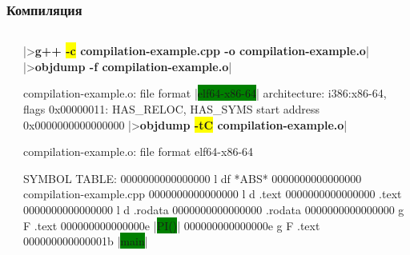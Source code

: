 \documentclass[compress]{beamer}
\newcommand{\shellprompt}{>}
\newcommand{\shellcommand}[1]{\shellprompt \space \textbf{#1}}
\begin{document}
\begin{frame}[fragile]

    \frametitle{Компиляция}

    \begin{columns}[T]

        \begin{column}{0.25\textwidth}


        \end{column}

        \begin{column}{0.75\textwidth}

            \begin{ConsoleWindow}
|\shellcommand{g++ \colorbox{yellow}{-c} compilation-example.cpp -o compilation-example.o}|
|\shellcommand{objdump -f compilation-example.o}|

compilation-example.o:     file format |\colorbox{green}{elf64-x86-64}|
architecture: i386:x86-64, flags 0x00000011:
HAS_RELOC, HAS_SYMS
start address 0x0000000000000000
|\shellcommand{objdump \colorbox{yellow}{-tC} compilation-example.o}|

compilation-example.o:     file format elf64-x86-64

SYMBOL TABLE:
0000000000000000 l    df *ABS*  0000000000000000 compilation-example.cpp
0000000000000000 l    d  .text  0000000000000000 .text
0000000000000000 l    d  .rodata        0000000000000000 .rodata
0000000000000000 g     F .text  000000000000000e |\colorbox{green}{PI()}|
000000000000000e g     F .text  000000000000001b |\colorbox{green}{main}|
            \end{ConsoleWindow}

        \end{column}

    \end{columns}

\end{frame}
\end{document}
